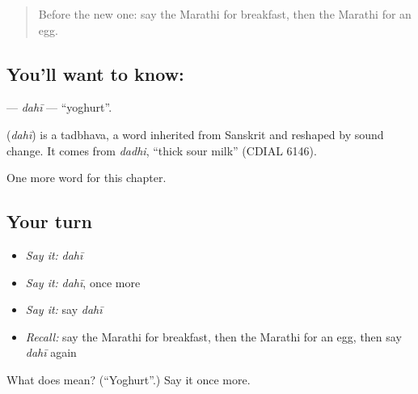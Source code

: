 \label{lesson:MR-C88-dahi}



\begin{quote}
Before the new one: say the Marathi for breakfast, then the Marathi for an egg.
\end{quote}

\subsection*{You'll want to know: }
\textbf{} — \emph{dahī} — \textquotedblleft{}yoghurt\textquotedblright{}.

\begin{cousinweb}
\textbf{} (\emph{dahī}) is a tadbhava, a word inherited from Sanskrit and reshaped by sound change. It comes from \emph{dadhi}, \textquotedblleft{}thick sour milk\textquotedblright{} (CDIAL 6146).
\end{cousinweb}

\begin{grammarlens}[title={What you've built}]
One more word for this chapter.
\end{grammarlens}

\subsection*{Your turn}
\begin{itemize}
\raggedright
  \item \emph{Say it:} \emph{dahī}
  \item \emph{Say it:} \emph{dahī}, once more
  \item \emph{Say it:} say \emph{dahī}
  \item \emph{Recall:} say the Marathi for breakfast, then the Marathi for an egg, then say \emph{dahī} again
\end{itemize}

\begin{tcolorbox}[breakable,colback=teal!4,colframe=teal!35!black,title={Before you move on}]
What does  mean? (\textquotedblleft{}Yoghurt\textquotedblright{}.) Say it once more.
\end{tcolorbox}
